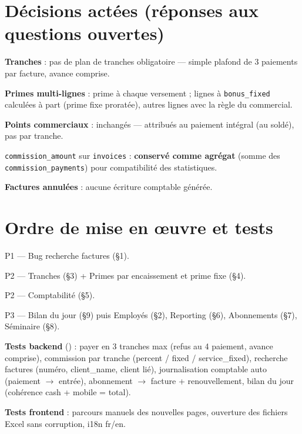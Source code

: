 \documentclass[11pt,a4paper]{article}
\newcommand{\taskitem}[1]{\item #1}
\newcommand{\codefile}[1]{\texttt{\detokenize{#1}}}
\newcommand{\code}[1]{{\small\color{black!80}\texttt{#1}}}
\begin{document}
\section{Décisions actées (réponses aux questions ouvertes)}

\begin{details}
\item \textbf{Tranches} : pas de plan de tranches obligatoire --- simple plafond de 3 paiements par facture, avance comprise.
\item \textbf{Primes multi-lignes} : prime à chaque versement ; lignes à \code{bonus\_fixed} calculées à part (prime fixe proratée), autres lignes avec la règle du commercial.
\item \textbf{Points commerciaux} : inchangés --- attribués au paiement intégral (au soldé), pas par tranche.
\item \code{commission\_amount} sur \code{invoices} : \textbf{conservé comme agrégat} (somme des \code{commission\_payments}) pour compatibilité des statistiques.
\item \textbf{Factures annulées} : aucune écriture comptable générée.
\end{details}

\section{Ordre de mise en œuvre et tests}

\begin{tasks}
\taskitem P1 --- Bug recherche factures (\S1).
\taskitem P2 --- Tranches (\S3) + Primes par encaissement et prime fixe (\S4).
\taskitem P2 --- Comptabilité (\S5).
\taskitem P3 --- Bilan du jour (\S9) puis Employés (\S2), Reporting (\S6), Abonnements (\S7), Séminaire (\S8).
\end{tasks}

\textbf{Tests backend} (\codefile{backend/tests/}) : payer en 3 tranches max (refus au 4\ieme{} paiement, avance comprise), commission par tranche (percent / fixed / service\_fixed), recherche factures (numéro, client\_name, client lié), journalisation comptable auto (paiement $\rightarrow$ entrée), abonnement $\rightarrow$ facture + renouvellement, bilan du jour (cohérence cash + mobile = total).

\textbf{Tests frontend} : parcours manuels des nouvelles pages, ouverture des fichiers Excel sans corruption, i18n fr/en.
\end{document}
